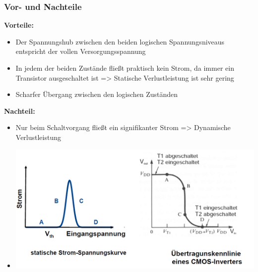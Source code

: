	\subsubsection{Vor- und Nachteile}
	\textbf{Vorteile:}
	\newline		
	\begin{itemize}
		\item Der Spannungshub zwischen den beiden logischen 	Spannungsniveaus entspricht der vollen 	Versorgungsspannung		
		\item In jedem der beiden Zustände fließt praktisch kein Strom, da immer ein Transistor ausgeschaltet ist => Statische Verlustleistung ist sehr gering 	
		\item Scharfer Übergang zwischen den logischen Zuständen
	\end{itemize}
	\textbf{Nachteil:}
	\newline		
	\begin{itemize}
		\item Nur beim Schaltvorgang fließt ein signifikanter Strom => Dynamische Verlustleistung
		\item	\includegraphics[width=0.4\linewidth]{Kapitel/Kap06/Nachteil}
		
	\end{itemize}
		

	
